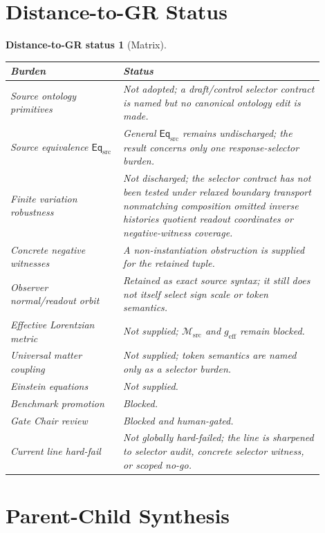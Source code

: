 \documentclass[11pt]{article}
\newcommand{\EqSrc}{\mathsf{Eq}_{\mathrm{src}}}
\newcommand{\Msrc}{\mathcal{M}_{\mathrm{src}}}
\newcommand{\geff}{g_{\mathrm{eff}}}
\newtheorem{distancestatus}{Distance-to-GR status}
\begin{document}
\section{Distance-to-GR Status}

\begin{distancestatus}[Matrix]
\begin{center}
\small
\begin{tabular}{p{0.32\linewidth}p{0.58\linewidth}}
\hline
\textbf{Burden} & \textbf{Status} \\
\hline
Source ontology primitives & Not adopted; a draft/control selector contract is named but no canonical ontology edit is made. \\
Source equivalence \(\EqSrc\) & General \(\EqSrc\) remains undischarged; the result concerns only one response-selector burden. \\
Finite variation robustness & Not discharged; the selector contract has not been tested under relaxed boundary transport nonmatching composition omitted inverse histories quotient readout coordinates or negative-witness coverage. \\
Concrete negative witnesses & A non-instantiation obstruction is supplied for the retained tuple. \\
Observer normal/readout orbit & Retained as exact source syntax; it still does not itself select sign scale or token semantics. \\
Effective Lorentzian metric & Not supplied; \(\Msrc\) and \(\geff\) remain blocked. \\
Universal matter coupling & Not supplied; token semantics are named only as a selector burden. \\
Einstein equations & Not supplied. \\
Benchmark promotion & Blocked. \\
Gate Chair review & Blocked and human-gated. \\
Current line hard-fail & Not globally hard-failed; the line is sharpened to selector audit, concrete selector witness, or scoped no-go. \\
\hline
\end{tabular}
\end{center}
\end{distancestatus}

\section{Parent-Child Synthesis}
\end{document}
